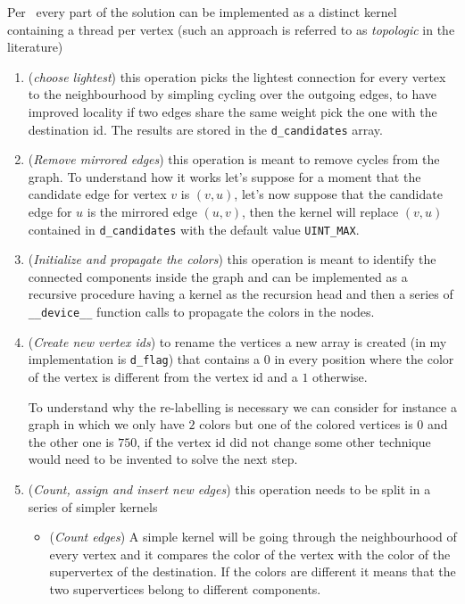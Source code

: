\documentclass[a4paper,10pt]{article}
\begin{document}
Per~\cite{generic-he-boruvka} every part of the solution can be implemented as a distinct kernel
containing a thread per vertex (such an approach is referred to as \textit{topologic} in the
literature)
\begin{enumerate}
	\item\label{item:choose-lightest} (\textit{choose lightest}) this operation picks the
		lightest connection for every vertex to the neighbourhood by simpling cycling over
		the outgoing edges, to have improved locality if two edges share the same weight pick the one with the destination id. The results are stored in the \texttt{d\_candidates} array.
	\item\label{item:mirror-removal} (\textit{Remove mirrored edges}) this operation is meant to
		remove cycles from the graph. To understand how it works let's suppose for a moment
		that the candidate edge for vertex $v$ is $(v, u)$, let's now suppose that the
		candidate edge for $u$ is the mirrored edge $(u, v)$, then the kernel will replace
		$(v, u)$ contained in \texttt{d\_candidates} with the default value
		\texttt{UINT\_MAX}.
	\item\label{item:coloration} (\textit{Initialize and propagate the colors}) this operation
		is meant to identify the connected components inside the graph and can be
		implemented as a recursive procedure having a kernel as the recursion head and then
		a series of \texttt{\_\_device\_\_} function calls to propagate the colors in the nodes.
	\item\label{item:vertex-rename} (\textit{Create new vertex ids}) to rename the vertices a
		new array is created (in my implementation is \texttt{d\_flag}) that contains a $0$
		in every position where the color of the vertex is different from the vertex id and
		a $1$ otherwise.
		
		To understand why the re-labelling is necessary we can consider for instance a graph
		in which we only have $2$ colors but one of the colored vertices is $0$ and the
		other one is $750$, if the vertex id did not change some other technique would need
		to be invented to solve the next step.
	\item\label{item:graph-contraction} (\textit{Count, assign and insert new edges}) this
		operation needs to be split in a series of simpler kernels
		\begin{itemize}
			\item\label{item:count-edges} (\textit{Count edges}) A simple kernel will be
				going through the neighbourhood of every vertex and it compares the
				color of the vertex with the color of the supervertex of the
				destination. If the colors are different it means that the two
				supervertices belong to different components.


\end{itemize}
\end{enumerate}
\end{document}
